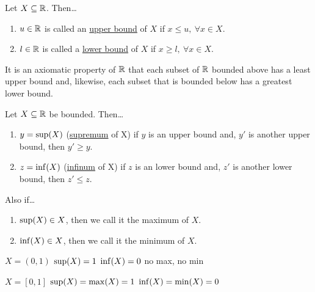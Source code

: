 
\begin{defn}
Let $X\subseteq \mathbb{R}$. Then\dots
\begin{enumerate}
	\item $u\in \mathbb{R}$ is called an \ul{upper bound} of $X$ if $x\leq u,\ \forall x\in X$.
	\item $l\in \mathbb{R}$ is called a \ul{lower bound} of $X$ if $x\geq l,\ \forall x\in X$.
\end{enumerate}
\end{defn}

It is an axiomatic property of $\mathbb{R}$ that each subset of $\mathbb{R}$ bounded above has a least upper bound and, likewise, each subset that is bounded below has a greatest lower bound.

\begin{defn}
	Let $X\subseteq \mathbb{R}$ be bounded. Then\dots
	\begin{enumerate}
	\item $y = \mathrm{sup}(X)$ (\ul{supremum} of X) if $y$ is an upper bound and, $y'$ is another upper bound, then $y' \geq y$.
	\item $z = \mathrm{inf}(X)$ (\ul{infinum} of X) if $z$ is an lower bound and, $z'$ is another lower bound, then $z' \leq z$.
\end{enumerate}
Also if\dots
\begin{enumerate}
\item $\mathrm{sup}(X)\in X$, then we call it the maximum of $X$.
\item $\mathrm{inf}(X)\in X$, then we call it the minimum of $X$.
\end{enumerate}
\end{defn}

\example

$X = (0,1)$ \qquad
$\mathrm{sup}(X) = 1$ \qquad
$\mathrm{inf}(X) = 0$ \qquad
no max, no min

$X = [0,1]$ \qquad
$\mathrm{sup}(X) = \mathrm{max}(X) = 1$ \qquad
$\mathrm{inf}(X) = \mathrm{min}(X) = 0$

